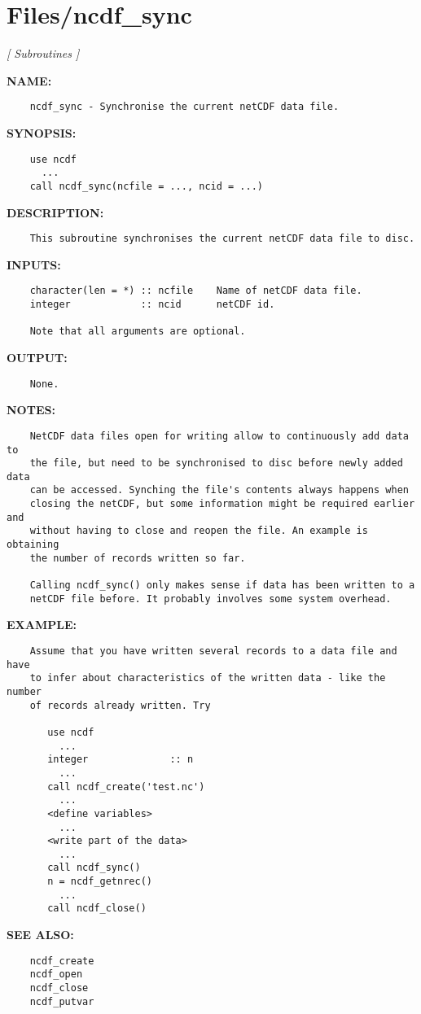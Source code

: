 \section{Files/ncdf\_sync}
\textsl{[ Subroutines ]}

\label{ch:robo63}
\label{ch:Files_ncdf_sync}
\textbf{NAME:}\hspace{0.08in}\begin{Verbatim}
    ncdf_sync - Synchronise the current netCDF data file.
\end{Verbatim}
\textbf{SYNOPSIS:}\hspace{0.08in}\begin{Verbatim}
    use ncdf
      ...
    call ncdf_sync(ncfile = ..., ncid = ...)
\end{Verbatim}
\textbf{DESCRIPTION:}\hspace{0.08in}\begin{Verbatim}
    This subroutine synchronises the current netCDF data file to disc.
\end{Verbatim}
\textbf{INPUTS:}\hspace{0.08in}\begin{Verbatim}
    character(len = *) :: ncfile    Name of netCDF data file.
    integer            :: ncid      netCDF id.

    Note that all arguments are optional.
\end{Verbatim}
\textbf{OUTPUT:}\hspace{0.08in}\begin{Verbatim}
    None.
\end{Verbatim}
\textbf{NOTES:}\hspace{0.08in}\begin{Verbatim}
    NetCDF data files open for writing allow to continuously add data to
    the file, but need to be synchronised to disc before newly added data
    can be accessed. Synching the file's contents always happens when
    closing the netCDF, but some information might be required earlier and
    without having to close and reopen the file. An example is obtaining
    the number of records written so far.

    Calling ncdf_sync() only makes sense if data has been written to a
    netCDF file before. It probably involves some system overhead.
\end{Verbatim}
\textbf{EXAMPLE:}\hspace{0.08in}\begin{Verbatim}
    Assume that you have written several records to a data file and have
    to infer about characteristics of the written data - like the number
    of records already written. Try

       use ncdf
         ...
       integer              :: n
         ...
       call ncdf_create('test.nc')
         ...
       <define variables>
         ...
       <write part of the data>
         ...
       call ncdf_sync()
       n = ncdf_getnrec()
         ...
       call ncdf_close()
\end{Verbatim}
\textbf{SEE ALSO:}\hspace{0.08in}\begin{Verbatim}
    ncdf_create
    ncdf_open
    ncdf_close
    ncdf_putvar
\end{Verbatim}
